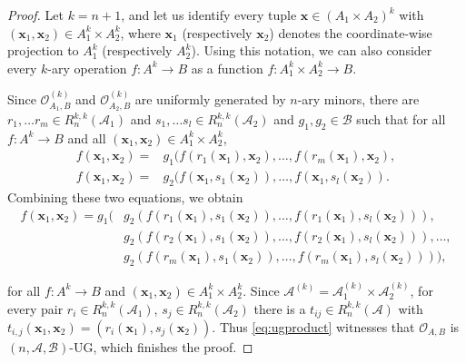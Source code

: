 \documentclass[11pt]{amsart}
\theoremstyle{plain}
\theoremstyle{definition}
\newcommand{\clone}[1]{\mathcal{#1}}
\newcommand{\clonoid}[1]{\mathcal{#1}}
\newcommand{\clodO}{\clonoid{O}}
\newcommand{\cloA}{\clone{A}}
\newcommand{\cloB}{\clone{B}}
\begin{document}
\begin{proof}
Let $k = n+1$, and let us identify every tuple $\mathbf x \in (A_1\times A_2)^k$ with $(\mathbf x_1,\mathbf x_2) \in A_1^k \times A_2^k$, where $\mathbf x_1$ (respectively $\mathbf x_2$) denotes the coordinate-wise projection to $A^k_1$ (respectively $A^k_2$). Using this notation, we can also consider every $k$-ary operation $f \colon A^k \to B$ as a function $f \colon A_1^k \times A_2^k \to B$.

Since $\clodO_{A_1,B}^{(k)}$ and $\clodO_{A_2,B}^{(k)}$ are uniformly generated by $n$-ary minors, there are $r_1,\ldots r_m \in R_n^{k,k}(\cloA_1)$ and $s_1,\ldots s_l \in R_n^{k,k}(\cloA_2)$ and $g_1,g_2 \in \cloB$ such that for all $f \colon A^k \to B$ and all $(\mathbf{x}_1,\mathbf{x}_2) \in A_1^k \times A_2^k$,
\begin{align*}
f(\mathbf x_1,\mathbf x_2) = &g_1(f(r_1(\mathbf x_1),\mathbf x_2),\dots, f(r_m(\mathbf x_1),\mathbf x_2),\\
f(\mathbf x_1,\mathbf x_2) = &g_2(f(\mathbf x_1,s_1(\mathbf x_2)),\dots, f(\mathbf x_1,s_l(\mathbf x_2)).
\end{align*}
Combining these two equations, we obtain
\begin{equation} \label{eq:ugproduct}
\begin{split}
f(\mathbf x_1,\mathbf x_2) = g_1( &g_2(f(r_1(\mathbf x_1),s_1(\mathbf x_2)),\ldots,f(r_1(\mathbf x_1),s_l(\mathbf x_2))) ,\\
 &g_2(f(r_2(\mathbf x_1),s_1(\mathbf x_2)),\ldots,f(r_2(\mathbf x_1),
s_l(\mathbf x_2))),\ldots,\\
&g_2(f(r_m(\mathbf x_1),s_1(\mathbf x_2)),\ldots, f(r_m(\mathbf x_1),s_l(\mathbf x_2)))),
\end{split}
\end{equation}


for all $f \colon A^k \to B$ and $(\mathbf{x}_1,\mathbf{x}_2) \in A_1^k \times A_2^k$. Since $\cloA^{(k)} 
= \cloA_1^{(k)} \times \cloA_2^{(k)}$, for every pair $r_i \in R_n^{k,k}(\cloA_1)$, $s_j \in R_n^{k,k}(\cloA_2)$ there is a $t_{ij} \in R_n^{k,k}(\cloA)$ with $t_{i,j}(\mathbf x_1,\mathbf x_2) = (r_i(\mathbf x_1),s_j(\mathbf x_2))$. Thus \eqref{eq:ugproduct} witnesses that $\clodO_{A,B}$ is $(n,\cloA,\cloB)$-UG, which finishes the proof.
\end{proof}
\end{document}
